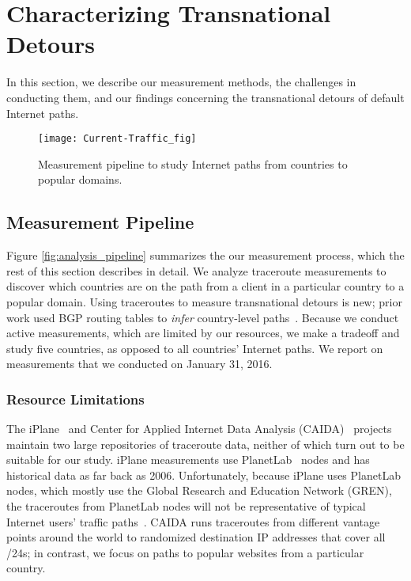 \section{Characterizing Transnational Detours}
\label{datasets}
In this section, we describe our measurement methods, the challenges in
conducting them, and our findings concerning the transnational detours
of default Internet paths.

\begin{figure*}[t]
\centering
\texttt{[image: Current-Traffic\_fig]}
\caption{Measurement pipeline to study Internet paths from countries to
  popular domains.}
\label{fig:pipeline1}
\end{figure*}


\subsection{Measurement Pipeline}
\label{pipeline}

Figure \ref{fig:analysis_pipeline} summarizes the our measurement
process, which the rest of this section describes in detail.  We analyze
traceroute measurements to discover which countries are on the path from
a client in a particular country to a popular domain.  Using traceroutes
to measure transnational detours is new; prior work used BGP routing
tables to \textit{infer} country-level paths~\cite{karlin2009nation}.
Because we conduct active measurements, which are limited by our
resources, we make a tradeoff and study five countries, as opposed to
all countries' Internet paths.  We report on measurements that we
conducted on January 31, 2016.

\subsubsection{Resource Limitations}
\label{resource_limits}

The iPlane~\cite{madhyastha2006iplane} and Center for Applied
Internet Data Analysis (CAIDA)~\cite{caida} projects maintain two large
repositories of traceroute data, neither of which turn out to be
suitable for our study.  iPlane measurements use
PlanetLab~\cite{planetlab} nodes and has historical data as far back as
2006.  Unfortunately, because iPlane uses PlanetLab nodes, which 
mostly use the Global Research and Education Network
(GREN), the traceroutes from PlanetLab nodes will not be representative
of typical Internet users' traffic paths~\cite{banerjee2004interdomain}.
CAIDA runs traceroutes from different vantage points around the world to
randomized destination IP addresses that cover all /24s; in 
contrast, we focus on paths to popular websites from a particular
country.

